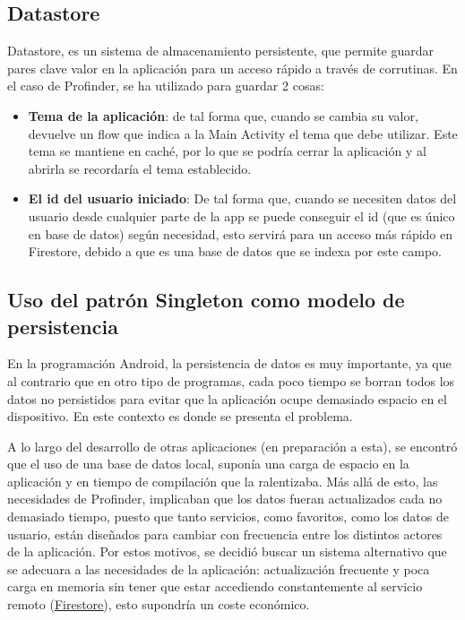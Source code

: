 \subsection{Datastore}
Datastore\hyperlink{cap:biblio}{}, es un sistema de almacenamiento persistente, que permite guardar pares clave valor en la aplicación para un acceso rápido a través de 
corrutinas\hyperlink{cap:biblio}{}. En el caso de Profinder, se ha utilizado para guardar 2 cosas:
\begin{itemize}
    \item \textbf{Tema de la aplicación}: de tal forma que, cuando se cambia su valor, devuelve un flow\hyperlink{cap:biblio}{} que indica a la Main Activity el tema que debe utilizar. Este tema se mantiene en caché, por lo que se podría cerrar la aplicación y al abrirla se recordaría el tema establecido.
    \item \textbf{El id del usuario iniciado}: De tal forma que, cuando se necesiten datos del usuario desde cualquier parte de la app se puede conseguir el id (que es único en base de datos) según necesidad, esto servirá para un acceso más rápido en Firestore, debido a que es una base de datos que se indexa por este campo.
\end{itemize}

\subsection{Uso del patrón Singleton como modelo de persistencia}
\label{subsec:singletonComoModelo}
En la programación Android, la persistencia de datos es muy importante, ya que al contrario que en otro tipo de programas, cada poco tiempo se borran todos los datos no persistidos para evitar que la aplicación ocupe demasiado espacio en el dispositivo. En este contexto es donde se presenta el problema.

A lo largo del desarrollo de otras aplicaciones (en preparación a esta), se encontró que el uso de una base de datos local, suponía una carga de espacio en la aplicación y en tiempo de compilación que la ralentizaba. Más allá de esto, las necesidades de Profinder, implicaban que los datos fueran actualizados cada no demasiado tiempo, puesto que tanto servicios, como favoritos, como los datos de usuario, están diseñados para cambiar con frecuencia entre los distintos actores de la aplicación. Por estos motivos, se decidió buscar un sistema alternativo que se adecuara a las necesidades de la aplicación: actualización frecuente y poca carga en memoria sin tener que estar accediendo constantemente al servicio remoto (\hyperlink{subsec:firestore}{Firestore}), esto supondría un coste económico.

